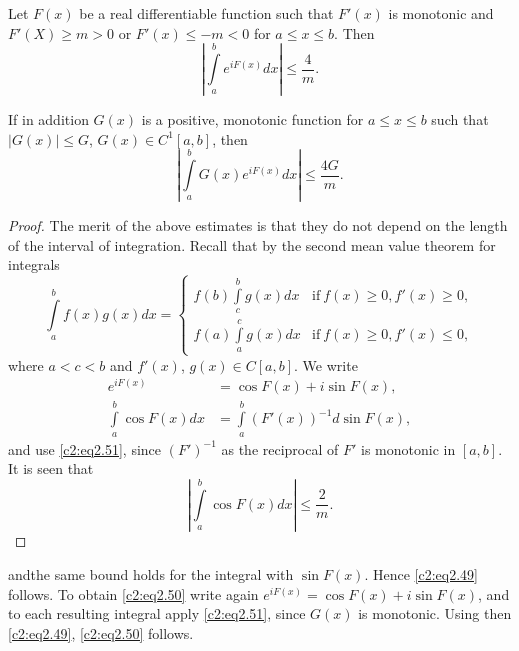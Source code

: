 \begin{lemma}\label{c2:lem2.1}
Let $F(x)$ be a real differentiable function such that $F'(x)$ is
monotonic and $F'(X)\geq m > 0$ or $F' (x) \leq - m < 0$ for $a \leq x
\leq b$. Then
\begin{equation}
  \left|\int\limits_a^b e^{iF(x)}dx \right| \leq
  \frac{4}{m}.\label{c2:eq2.49} 
\end{equation}

If in addition $G(x)$ is a positive, monotonic function for $a \leq x
\leq b$ such that $|G(x)| \leq G$, $G(x) \in C^1 [a, b]$, then
\begin{equation}
  \left|\int\limits_a^b G(x) e^{iF(x)}dx \right| \leq
  \frac{4G}{m}.\label{c2:eq2.50}   
\end{equation}
\end{lemma}

\begin{proof}
  The merit of the above estimates is that they do not depend on the
  length of the interval of integration. Recall that by the second
  mean value theorem for integrals
  \begin{equation}
    \int\limits_a^b f(x) g(x) dx= 
    \begin{cases}
      f(b) \int\limits_c^b g(x) dx & \text{if}~ f(x) \geq 0, f' (x)
      \geq 0,\\
      f(a) \int\limits_a^c g(x) dx & \text{if}~ f(x) \geq 0, f' (x)
      \leq 0,
    \end{cases}\label{c2:eq2.51}
  \end{equation}
  where $a < c < b$ and $f' (x)$, $g(x) \in C[a, b]$. We write
\begin{align*}
  e^{iF (x)} & = \cos F(x) + i \sin F(x),\\
  \int\limits_a^b \cos F(x) dx & = \int\limits_a^b (F' (x))^{-1} d
  \sin F(x),
\end{align*}
and use \eqref{c2:eq2.51}, since $(F')^{-1}$ as the reciprocal of $F'$
is monotonic in $[a, b]$. It is seen that
$$
  \left|\int\limits_a^b \cos F(x)dx \right| \leq  \frac{2}{m}.
$$
\end{proof}
and\pageoriginale the same bound holds for the integral with $\sin
F(x)$. Hence \eqref{c2:eq2.49} follows. To obtain \eqref{c2:eq2.50}
write again $e^{iF(x)}= \cos F(x) +i \sin F(x)$, and to each resulting
integral apply \eqref{c2:eq2.51}, since $G(x)$ is monotonic. Using
then \eqref{c2:eq2.49}, \eqref{c2:eq2.50} follows.


